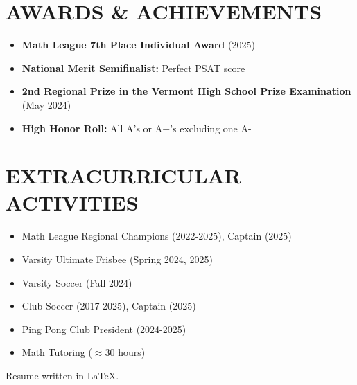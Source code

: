 \documentclass[10pt,letterpaper]{article}
\begin{document}
\vspace{0.5em}
\section{AWARDS \& ACHIEVEMENTS}
\vspace{0.5em}
\begin{itemize}[leftmargin=*,nosep,itemsep=2pt]
  \item \textbf{Math League 7th Place Individual Award} (2025)
  \item \textbf{National Merit Semifinalist:} Perfect PSAT score
  \item \textbf{2nd Regional Prize in the Vermont High School Prize Examination} (May 2024)
  \item \textbf{High Honor Roll:} All A's or A+'s excluding one A-
\end{itemize}

\vspace{0.5em}
\section{EXTRACURRICULAR ACTIVITIES}
\vspace{0.5em}
\begin{minipage}[t]{0.48\textwidth}
\begin{itemize}[leftmargin=*,nosep,itemsep=2pt]
  \item Math League Regional Champions (2022-2025), Captain (2025)
  \item Varsity Ultimate Frisbee (Spring 2024, 2025)
  \item Varsity Soccer (Fall 2024)
\end{itemize}
\end{minipage}
\hfill
\begin{minipage}[t]{0.48\textwidth}
\begin{itemize}[leftmargin=*,nosep,itemsep=2pt]
  \item Club Soccer (2017-2025), Captain (2025)
  \item Ping Pong Club President (2024-2025)
  \item Math Tutoring ($\approx$30 hours)
\end{itemize}
\end{minipage}

\vspace{0.5em}
\begin{flushright}
  \footnotesize Resume written in \LaTeX.
\end{flushright}
\end{document}
